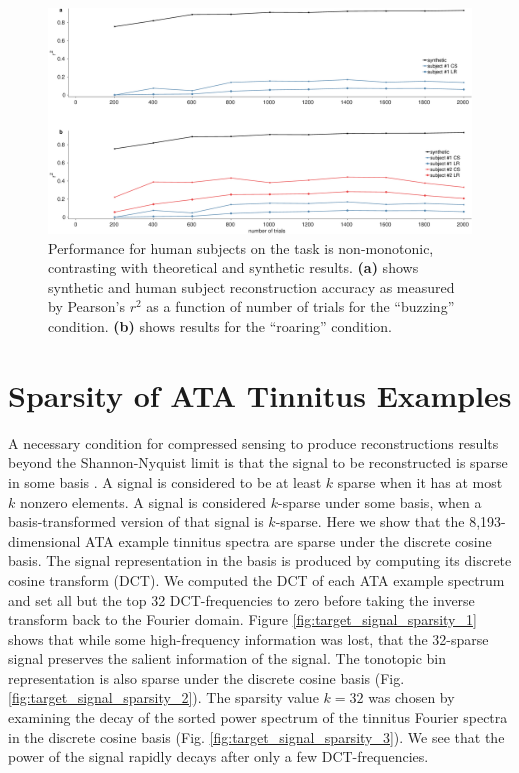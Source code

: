 \documentclass[journal]{IEEEtran}
\begin{document}
\begin{figure}[h]
	\centering
	\includegraphics[width=\linewidth]{gfx/r2_vs_trials.eps}
	\caption{Performance for human subjects on the task is non-monotonic,
  contrasting with theoretical and synthetic results.
  \textbf{(a)} shows synthetic and human subject reconstruction accuracy
  as measured by Pearson's $r^2$ as a function of number of trials
  for the ``buzzing'' condition. \textbf{(b)} shows results for the ``roaring'' condition.}
	\label{fig:r2_vs_trials}
\end{figure}

\section{Sparsity of ATA Tinnitus Examples}

A necessary condition for compressed sensing to produce reconstructions results
beyond the Shannon-Nyquist limit is that the signal to be reconstructed is sparse in some basis
\cite{taghoutiCompressedSensing2020}.
A signal is considered to be at least $k$ sparse when it has at most $k$ nonzero elements.
A signal is considered $k$-sparse under some basis, when a basis-transformed version
of that signal is $k$-sparse.
Here we show that the 8,193-dimensional ATA example tinnitus spectra are sparse under
the discrete cosine basis.
The signal representation in the basis is produced by computing its discrete cosine transform (DCT).
We computed the DCT of each ATA example spectrum
and set all but the top 32 DCT-frequencies to zero
before taking the inverse transform back to the Fourier domain.
Figure \ref{fig:target_signal_sparsity_1}
shows that while some high-frequency information was lost,
that the 32-sparse signal preserves the salient information of the signal.
The tonotopic bin representation is also sparse under the discrete cosine basis
(Fig. \ref{fig:target_signal_sparsity_2}).
The sparsity value $k=32$ was chosen by examining the decay of the sorted power spectrum
of the tinnitus Fourier spectra in the discrete cosine basis (Fig. \ref{fig:target_signal_sparsity_3}).
We see that the power of the signal rapidly decays after only a few DCT-frequencies.
\end{document}
